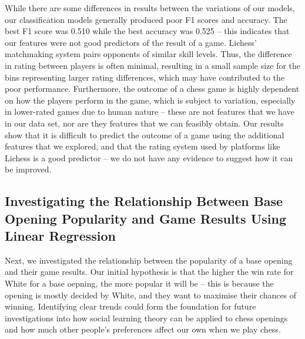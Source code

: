 \documentclass[a4paper, 11pt]{article}
\begin{document}
While there are some differences in results between the variations of our models, our classification models generally produced poor F1 scores and accuracy. The best F1 score was 0.510 while the best accuracy was 0.525 -- this indicates that our features were not good predictors of the result of a game. Lichess' matchmaking system pairs opponents of similar skill levels. Thus, the difference in rating between players is often minimal, resulting in a small sample size for the bins representing larger rating differences, which may have contributed to the poor performance. Furthermore, the outcome of a chess game is highly dependent on how the players perform in the game, which is subject to variation, especially in lower-rated games due to human nature -- these are not features that we have in our data set, nor are they features that we can feasibly obtain. Our results show that it is difficult to predict the outcome of a game using the additional features that we explored, and that the rating system used by platforms like Lichess is a good predictor -- we do not have any evidence to suggest how it can be improved.

\subsection{Investigating the Relationship Between Base Opening Popularity and Game Results Using Linear Regression}
Next, we investigated the relationship between the popularity of a base opening and their game results. Our initial hypothesis is that the higher the win rate for White for a base oepning, the more popular it will be -- this is because the opening is mostly decided by White, and they want to maximise their chances of winning. Identifying clear trends could form the foundation for future investigations into how social learning theory can be applied to chess openings and how much other people's preferences affect our own when we play chess.
\end{document}
